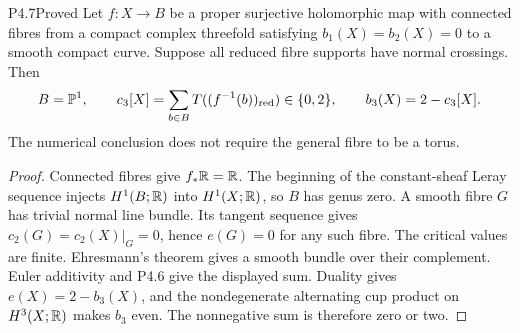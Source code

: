 \begin{statement}{P4.7}{Proved}
Let $f:X\to B$ be a proper surjective holomorphic map with connected
fibres from a compact complex threefold satisfying $b_1(X)=b_2(X)=0$
to a smooth compact curve. Suppose all reduced fibre supports have
normal crossings. Then
\[
 B=\mathbb P^1,\qquad
 c_3[X]=\sum_{b\in B}T((f^{-1}(b))_{\mathrm{red}})\in\{0,2\},\qquad
 b_3(X)=2-c_3[X].
\]
The numerical conclusion does not require the general fibre to be a
torus.
\end{statement}
\begin{proof}
Connected fibres give $f_*\mathbb R=\mathbb R$. The beginning of the constant-sheaf
Leray sequence injects $H^1(B;\mathbb R)$ into $H^1(X;\mathbb R)$, so $B$ has genus
zero. A smooth fibre $G$ has trivial normal line bundle. Its tangent
sequence gives $c_2(G)=c_2(X)|_G=0$, hence $e(G)=0$ for any such fibre.
The critical values are finite. Ehresmann's theorem gives a smooth
bundle over their complement. Euler additivity and P4.6 give the
displayed sum. Duality gives $e(X)=2-b_3(X)$, and the nondegenerate
alternating cup product on $H^3(X;\mathbb R)$ makes $b_3$ even. The
nonnegative sum is therefore zero or two.
\end{proof}

